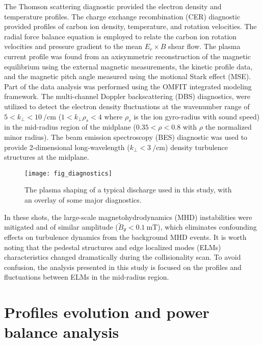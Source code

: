 \documentclass[english,aip,pop,superscriptaddress,preprint,letterpaper]{revtex4-2}
\begin{document}
The Thomson scattering diagnostic\cite{eldonInitialResultsHigh2012} provided the electron density and temperature profiles.
The charge exchange recombination (CER) diagnostic\cite{chrystalImprovedEdgeCharge2016} provided profiles of carbon ion density, temperature, and rotation velocities.
The radial force balance equation is employed to relate the carbon ion rotation velocities and pressure gradient to the mean $E_{r} \times B$ shear flow.\cite{groebnerRoleEdgeElectric1990}
The plasma current profile was found from an axisymmetric reconstruction of the magnetic equilibrium using the external magnetic measurements, the kinetic profile data, and the magnetic pitch angle measured using the motional Stark effect (MSE).\cite{wroblewskiPolarimetryMotionalStark1992,laoEquilibriumAnalysisCurrent1990}
Part of the data analysis was performed using the OMFIT integrated modeling framework. \cite{meneghiniIntegratedModelingApplications2015} 
The multi-channel Doppler backscattering (DBS) diagnostics,\cite{peeblesNovelMultichannelCombfrequency2010} were utilized to detect the electron density fluctuations at the wavenumber range of $5<k_{\perp}<\SI{10}{\per\cm}$ ($1<k_{\bot}\rho_{s}<4$ where $\rho_{s}$ is the ion gyro-radius with sound speed) in the mid-radius region of the midplane ($0.35<\rho<0.8$ with $\rho$ the normalized minor radius).
The beam emission spectroscopy (BES) diagnostic\cite{mckeeWidefieldTurbulenceImaging2010} was used to provide 2-dimensional long-wavelength ($k_\bot<\SI{3}{\per\cm}$) density turbulence structures at the midplane.

\begin{figure}
    \texttt{[image: fig\_diagnostics]}
    \caption{\label{fig:diagnostics}The plasma shaping of a typical discharge used in this study, with an overlay of some major diagnostics.}
\end{figure}

In these shots, the large-scale magnetohydrodynamics (MHD) instabilities were mitigated and of similar amplitude ($\tilde{B}_{\theta}<\SI{0.1}{\milli\tesla}$), which eliminates confounding effects on turbulence dynamics from the background MHD events.
It is worth noting that the pedestal structures and edge localized modes (ELMs) characteristics changed dramatically during the collisionality scan.
To avoid confusion, the analysis presented in this study is focused on the profiles and fluctuations between ELMs in the mid-radius region.

\section{Profiles evolution and power balance analysis\label{sec:profiles}}
\end{document}
